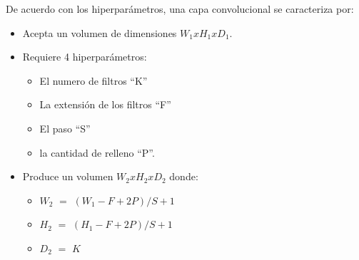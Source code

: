 De acuerdo con los hiperparámetros, una capa convolucional se caracteriza por:
\begin{itemize}
    \item Acepta un volumen de dimensiones $W_{1}xH_{1}xD_{1}$.
    \item Requiere 4 hiperparámetros:
    \begin{itemize}
        \item El numero de filtros ``K''
        \item La extensión de los filtros ``F''
        \item El paso ``S''
        \item la cantidad de relleno ``P''.
    \end{itemize}
    \item Produce un volumen $W_{2}xH_{2}xD_{2}$ donde:
    \begin{itemize}
        \item $W_{2}$ $=$ $(W_{1} - F + 2P)/S+1$
        \item $H_{2}$ $=$ $(H_{1} - F + 2P)/S+1$
        \item $D_{2}$ $=$ $K$
    \end{itemize}
\end{itemize}
